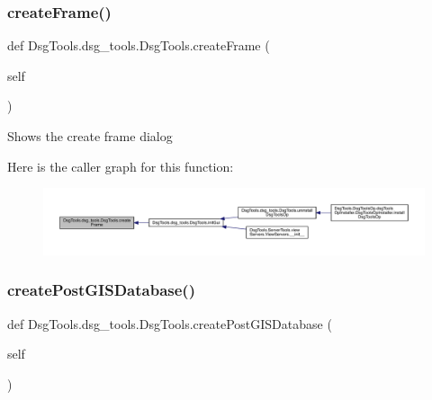 \subsubsection{\texorpdfstring{create\+Frame()}{createFrame()}}
{\footnotesize\ttfamily def Dsg\+Tools.\+dsg\+\_\+tools.\+Dsg\+Tools.\+create\+Frame (\begin{DoxyParamCaption}\item[{}]{self }\end{DoxyParamCaption})}

\begin{DoxyVerb}Shows the create frame dialog
\end{DoxyVerb}
 Here is the caller graph for this function\+:
\nopagebreak
\begin{figure}[H]
\begin{center}
\leavevmode
\includegraphics[width=350pt]{class_dsg_tools_1_1dsg__tools_1_1_dsg_tools_a95aadbdfdaefe737fed7d2b7352f2d1e_icgraph}
\end{center}
\end{figure}
\mbox{\label{class_dsg_tools_1_1dsg__tools_1_1_dsg_tools_a61a45262ec8f5921d73c830dce9c41f7}} 
\subsubsection{\texorpdfstring{create\+Post\+G\+I\+S\+Database()}{createPostGISDatabase()}}
{\footnotesize\ttfamily def Dsg\+Tools.\+dsg\+\_\+tools.\+Dsg\+Tools.\+create\+Post\+G\+I\+S\+Database (\begin{DoxyParamCaption}\item[{}]{self }\end{DoxyParamCaption})}

